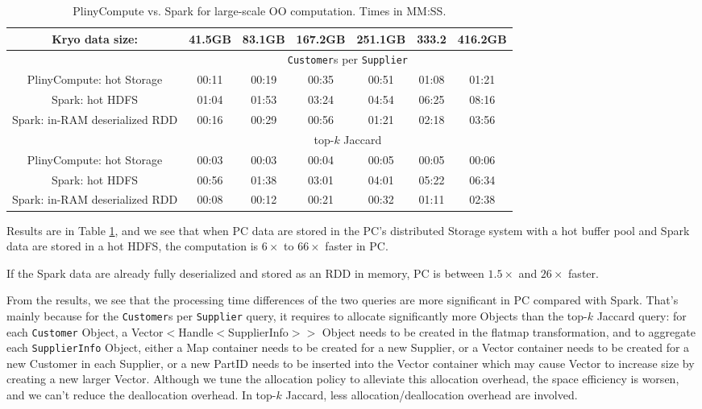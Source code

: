 \begin{table}[h!]
\begin{center}
\begin{tabular}{|c||c|c|c|c|c|c|}
\hline
Kryo data size: &41.5GB & 83.1GB & 167.2GB &251.1GB &333.2 &416.2GB \\
\hline
& \multicolumn{6}{c|}{\texttt{Customer}s per \texttt{Supplier}} \\
\hline
PlinyCompute: hot Storage & 00:11&	00:19&	00:35&	00:51&	01:08&	01:21 \\
Spark: hot HDFS & 01:04&	01:53&	03:24&	04:54&	06:25&	08:16\\
Spark: in-RAM deserialized RDD & 00:16& 	00:29& 	00:56& 	01:21& 	02:18& 	03:56\\
\hline
& \multicolumn{6}{c|}{top-$k$ Jaccard} \\
\hline
PlinyCompute: hot Storage & 00:03&	00:03&	00:04&	00:05&	00:05&	00:06 \\
Spark: hot HDFS & 00:56&	01:38&	03:01 & 04:01&	05:22&	06:34\\
Spark: in-RAM deserialized RDD & 00:08& 	00:12& 	00:21 & 00:32& 	01:11& 	02:38\\
\hline
\end{tabular}
\caption{PlinyCompute vs. Spark for large-scale OO computation. Times in MM:SS.}
\label{fig:TPC}
\end{center}
\end{table}

Results are in Table \ref{fig:TPC},  and we see that when PC data are
stored in the PC's distributed Storage system with a hot buffer pool and Spark data
are stored in
a hot HDFS, the computation is $6\times$ to $66\times$ faster in PC.  

If the Spark data are already
fully deserialized and stored as an RDD in memory, PC is 
between $1.5\times$ and $26\times$ faster.

From the results, we see that the processing time differences of the
two queries are more significant in PC compared with Spark. That's
mainly because for the \texttt{Customer}s per \texttt{Supplier} query,
it requires to allocate significantly more Objects than the top-$k$
Jaccard query: for each \texttt{Customer} Object, a
Vector$<$Handle$<$SupplierInfo$>$$>$ Object needs to be created in the
flatmap transformation, and to aggregate each \texttt{SupplierInfo}
Object, either a Map container needs to be created for a new Supplier,
or a Vector container needs to be created for a new Customer in each
Supplier, or a new PartID needs to be inserted into the Vector
container which may cause Vector to increase size by creating a new
larger Vector. Although we tune the allocation policy to alleviate
this allocation overhead, the space efficiency is worsen, and we can't reduce the deallocation
overhead. In top-$k$ Jaccard, less allocation/deallocation overhead
are involved.

